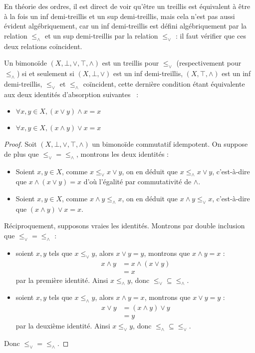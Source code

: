 En théorie des ordres, il est direct de voir qu'être un treillis est équivalent
à être à la fois un inf demi-treillis et un sup demi-treillis, mais cela n'est
pas aussi évident algébriquement, car un inf demi-treillis est défini
algébriquement par la relation $\leq_\land$ et un sup demi-treillis par la
relation $\leq_\lor$ : il faut vérifier que ces deux relations coïncident.

\begin{proposition}
  Un bimonoïde $(X,\bot,\lor,\top,\land)$ est un treillis pour $\leq_\lor$
  (respectivement pour $\leq_\land$) si et seulement si $(X,\bot,\lor)$ est un
  inf demi-treillis, $(X,\top,\land)$ est un inf demi-treillis, $\leq_\lor$ et
  $\leq_\land$ coïncident, cette dernière condition étant équivalente aux
  deux identités d'absorption suivantes~ :
  \begin{itemize}
  \item $\forall x,y\in X, (x\lor y)\land x = x$
  \item $\forall x,y\in X, (x\land y)\lor x = x$
  \end{itemize}
\end{proposition}

\begin{proof}
  Soit $(X,\bot,\lor,\top,\land)$ un bimonoïde commutatif idempotent. On
  suppose de plus que $\leq_\lor = \leq_\land$, montrons les deux identités :
  \begin{itemize}
  \item Soient $x,y\in X$, comme $x\leq_\lor x\lor y$, on en déduit que
    $x\leq_\land x\lor y$, c'est-à-dire que $x\land (x\lor y) = x$ d'où
    l'égalité par commutativité de $\land$.
  \item Soient $x,y\in X$, comme $x\land y\leq_\land x$, on en déduit que
    $x\land y \leq_\lor x$, c'est-à-dire que $(x\land y)\lor x = x$.
  \end{itemize}

  Réciproquement, supposons vraies les identités. Montrons par double inclusion
  que $\leq_\lor = \leq_\land$ :
  \begin{itemize}
  \item soient $x,y$ tels que $x\leq_\lor y$, alors $x\lor y = y$, montrons que
    $x\land y = x$ :
    \begin{align*}
      x \land y &= x \land (x \lor y)\\
      &= x
    \end{align*}
    par la première identité. Ainsi $x\leq_\land y$, donc
    $\leq_\lor\subseteq\leq_\land$.
  \item soient $x,y$ tels que $x\leq_\land y$, alors $x\land y = x$, montrons que
    $x\lor y = y$ :
    \begin{align*}
      x \lor y &= (x\land y) \lor y\\
      &= y
    \end{align*}
    par la deuxième identité. Ainsi $x\leq_\lor y$, donc
    $\leq_\land\subseteq\leq_\lor$.
  \end{itemize}
  Donc $\leq_\lor = \leq_\land$.
\end{proof}

